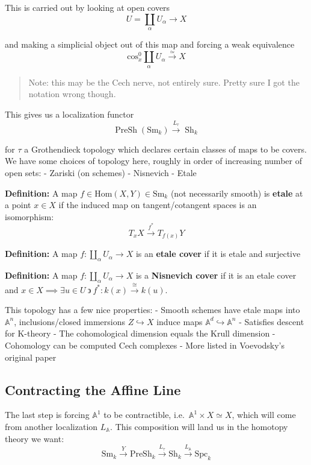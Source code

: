 \documentclass[11pt]{scrreprt}
\theoremstyle{definition}
\newcommand{\Af}[0]{{\mathbb{A}}}
\newcommand{\suchthat}[0]{{~\backepsilon ~}}
\newcommand{\mapsvia}[1]{\xrightarrow{#1}}
\newcommand{\Sm}[0]{{\text{Sm}_k}}
\newcommand{\homotopic}[0]{\simeq}
\newcommand{\cross}[0]{\times}
\newcommand{\injects}[0]{\hookrightarrow}
\renewcommand{\hom}[0]{\text{Hom}}
\begin{document}
This is carried out by looking at open covers \[
U = \coprod_{\alpha} U_\alpha \to X
\]

and making a simplicial object out of this map and forcing a weak
equivalence \[
\text{cos}^0_x \coprod_\alpha U_\alpha \mapsvia{\homotopic} X
\]

\begin{quote}
Note: this may be the Cech nerve, not entirely sure. Pretty sure I got
the notation wrong though.
\end{quote}

This gives us a localization functor \[
\operatorname{PreSh}(\Sm) \mapsvia{L_\tau} \operatorname{Sh}_k
\]

for \(\tau\) a Grothendieck topology which declares certain classes of
maps to be covers. We have some choices of topology here, roughly in
order of increasing number of open sets: - Zariski (on schemes) -
Nisnevich - Etale

\textbf{Definition:} A map \(f\in \hom(X,Y) \in \Sm\) (not necessarily
smooth) is \textbf{etale} at a point \(x\in X\) if the induced map on
tangent/cotangent spaces is an isomorphism: \[
T_x X \mapsvia{f^*} T_{f(x)}Y
\]

\textbf{Definition:} A map \(f: \coprod_\alpha U_\alpha \to X\) is an
\textbf{etale cover} if it is etale and surjective

\textbf{Definition:} A map \(f: \coprod_\alpha U_\alpha \to X\) is a
\textbf{Nisnevich cover} if it is an etale cover and
\(x\in X \implies \exists u\in U \suchthat f^*: k(x) \mapsvia{\cong}k(u)\).

This topology has a few nice properties: - Smooth schemes have etale
maps into \(\Af^n\), inclusions/closed immersions \(Z \injects X\)
induce maps \(\Af^d \injects \Af^n\) - Satisfies descent for K-theory -
The cohomological dimension equals the Krull dimension - Cohomology can
be computed Cech complexes - More listed in Voevodsky's original paper

\hypertarget{contracting-the-affine-line}{%
\subsection{Contracting the Affine
Line}\label{contracting-the-affine-line}}

The last step is forcing \(\Af^1\) to be contractible,
i.e.~\(\Af^1 \cross X \homotopic X\), which will come from another
localization \(L_\Af\). This composition will land us in the homotopy
theory we want: \[
\Sm \mapsvia{Y} \text{PreSh}_k \mapsvia{L_\tau} \text{Sh}_k \mapsvia{L_{\Af}} \text{Spc}_k
\]
\end{document}
